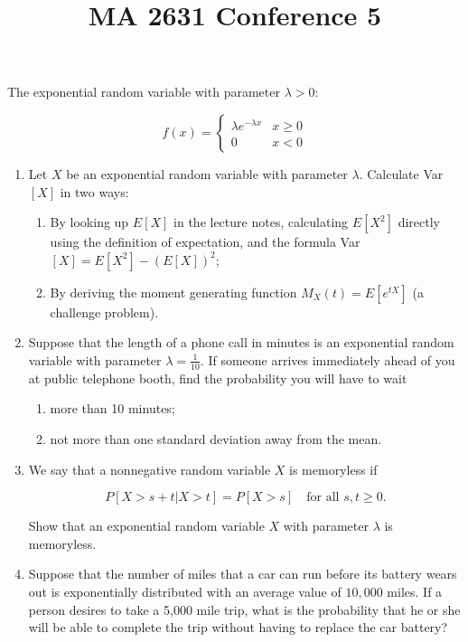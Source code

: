 \documentclass{article}
\title{MA 2631 Conference 5}
\begin{document}
\maketitle

The exponential random variable with parameter $\lambda >0$:

$$
f(x) = \begin{cases}
\lambda e^{-\lambda x} & x \geq 0 \\
0 & x < 0
\end{cases}
$$

\begin{enumerate}

\item

Let $X$ be an exponential random variable with parameter $\lambda$. Calculate Var$[X]$ in two ways:

\begin{enumerate}
\item By looking up $E[X]$ in the lecture notes, calculating $E[X^2]$ directly using the definition of expectation, and the formula Var$[X] = E[X^2] - (E[X])^2$;

\item By deriving the moment generating function $M_X(t) = E[e^{tX}]$ (a challenge problem). 
\end{enumerate}

\item

Suppose that the length of a phone call in minutes is an exponential random variable with parameter $\lambda = \frac{1}{10}$. If someone arrives immediately ahead of you at public telephone booth, find the probability you will have to wait

\begin{enumerate}
\item more than 10 minutes;

\item not more than one standard deviation away from the mean. 

\end{enumerate}

\item We say that a nonnegative random variable $X$ is memoryless if

$$P[X > s+t \vert X > t] = P[X > s] \quad \text{for all } s, t \geq 0.$$ 

Show that an exponential random variable $X$ with parameter $\lambda$ is memoryless.


\item
Suppose that the number of miles that a car can run before its battery wears out is exponentially distributed with an average value of $10,000$ miles. If a person desires to take a 5,000 mile trip, what is the probability that he or she will be able to complete the trip without having to replace the car battery?

\end{enumerate}
\end{document}
